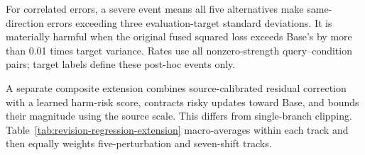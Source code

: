 For correlated errors, a severe event means all five alternatives make
same-direction errors exceeding three evaluation-target standard deviations.
It is materially harmful when the original fused squared loss exceeds Base's
by more than 0.01 times target variance. Rates use all nonzero-strength
query--condition pairs; target labels define these post-hoc events only.




A separate composite extension combines source-calibrated residual correction
with a learned harm-risk score, contracts risky updates toward Base, and bounds
their magnitude using the source scale. This differs from single-branch clipping.
Table~\ref{tab:revision-regression-extension} macro-averages within each track
and then equally weights five-perturbation and seven-shift tracks.



\FloatBarrier
\endgroup
